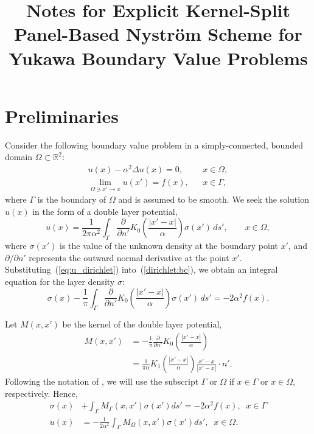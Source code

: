 \documentclass[12pt]{article}
\newcommand{\pderiv}[2]{\frac{\partial #1}{\partial #2}}
\newcommand{\eqr}[1]{~(\ref{#1})}
\begin{document}
\title{Notes for Explicit Kernel-Split Panel-Based Nystr\" om Scheme for Yukawa Boundary Value Problems}
\date{}
\maketitle
\section{Preliminaries}
Consider the following boundary value problem in a simply-connected, bounded domain $\Omega \subset \mathbb{R}^2$:
\begin{eqnarray}
  u(x) - \alpha^2 \Delta u(x) = 0, && {x} \in \Omega,  \nonumber \\
  \lim_{\Omega \ni x' \rightarrow x} u(x') = f(x), && x \in \Gamma,
  \label{dirichlet:bc}
\end{eqnarray}
where $\Gamma$ is the boundary of $\Omega$ and is assumed to be smooth.
We seek the solution $u(x)$ in the form of a double layer potential, 
\begin{equation}
  u(x)=\frac{1}{2\pi\alpha^2}\int_{\Gamma}\pderiv{}{n'}K_{0}
  \left(\frac{|x'-x|}{\alpha} \right) \sigma(x') \, ds', \qquad x \in \Omega, 
  \label{eq:u_dirichlet}
\end{equation}
where $\sigma(x')$ is the value of the unknown
density at the boundary point $x'$, and $\partial / \partial n'$
represents the outward normal derivative at the point $x'$.
Substituting\eqr{eq:u_dirichlet} into\eqr{dirichlet:bc}, we obtain an integral equation for the layer density $\sigma$:
\begin{equation}
  \label{dirichlet:inteqn}
\sigma(x)- \frac{1}{\pi}
  \int_{\Gamma}\pderiv{}{n'}K_{0}\left(\frac{|x' - x|}{\alpha}\right)
  \sigma(x')\, ds' = -2 \alpha^2 f(x) .
\end{equation}

Let $M(x, x')$ be the kernel of the double layer potential, 
\begin{align}
M(x, x') & = -\frac{1}{\pi} \pderiv{}{n'}K_{0}\left(\frac{|x' - x|}{\alpha}\right) \nonumber \\
            & = \frac{1}{\pi \alpha} K_1 \left( \frac{|x' - x|}{\alpha} \right)
                         \frac{x'-x }{|x' - x|} \cdot n' . \label{kernel}
\end{align}
Following the notation of \cite{HelsingHolst}, we will use the subscript $\Gamma$ or $\Omega$ if $x\in \Gamma$ or $x\in \Omega$, respectively.
Hence, 
\begin{align}
\sigma(x) & + \int_\Gamma M_\Gamma(x, x') \sigma(x') ds' = -2 \alpha^2 f(x), \; \; x \in \Gamma \label{IE} \\
u(x) & = -\frac{1}{2\alpha^2} \int_\Gamma M_\Omega(x, x') \sigma(x') ds', \; \; x \in \Omega. \label{DLP}
\end{align}
\end{document}
